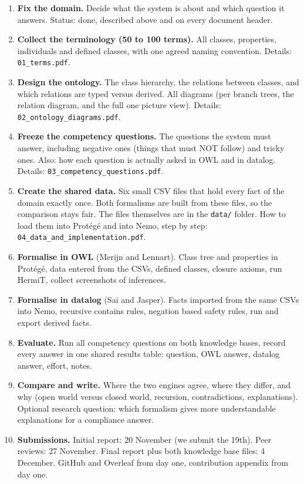 \documentclass[11pt,a4paper]{article}
\begin{document}
\begin{enumerate}[leftmargin=*, itemsep=4pt]
\item \textbf{Fix the domain.} Decide what the system is about and which question it answers. Status: done, described above and on every document header.
\item \textbf{Collect the terminology (50 to 100 terms).} All classes, properties, individuals and defined classes, with one agreed naming convention. Details: \texttt{01\_terms.pdf}.
\item \textbf{Design the ontology.} The class hierarchy, the relations between classes, and which relations are typed versus derived. All diagrams (per branch trees, the relation diagram, and the full one picture view). Details: \texttt{02\_ontology\_diagrams.pdf}.
\item \textbf{Freeze the competency questions.} The questions the system must answer, including negative ones (things that must NOT follow) and tricky ones. Also: how each question is actually asked in OWL and in datalog. Details: \texttt{03\_competency\_questions.pdf}.
\item \textbf{Create the shared data.} Six small CSV files that hold every fact of the domain exactly once. Both formalisms are built from these files, so the comparison stays fair. The files themselves are in the \texttt{data/} folder. How to load them into Prot\'eg\'e and into Nemo, step by step: \texttt{04\_data\_and\_implementation.pdf}.
\item \textbf{Formalise in OWL} (Merijn and Lennart). Class tree and properties in Prot\'eg\'e, data entered from the CSVs, defined classes, closure axioms, run HermiT, collect screenshots of inferences.
\item \textbf{Formalise in datalog} (Sai and Jasper). Facts imported from the same CSVs into Nemo, recursive contains rules, negation based safety rules, run and export derived facts.
\item \textbf{Evaluate.} Run all competency questions on both knowledge bases, record every answer in one shared results table: question, OWL answer, datalog answer, effort, notes.
\item \textbf{Compare and write.} Where the two engines agree, where they differ, and why (open world versus closed world, recursion, contradictions, explanations). Optional research question: which formalism gives more understandable explanations for a compliance answer.
\item \textbf{Submissions.} Initial report: 20 November (we submit the 19th). Peer reviews: 27 November. Final report plus both knowledge base files: 4 December. GitHub and Overleaf from day one, contribution appendix from day one.
\end{enumerate}
\end{document}
